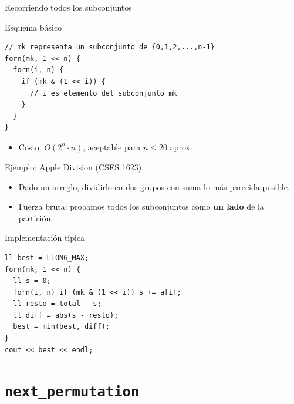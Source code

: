 \documentclass[aspectratio=169]{beamer}
\begin{document}
\begin{frame}[fragile]{Recorriendo todos los subconjuntos}
  \begin{block}{Esquema básico}
  \begin{lstlisting}[style=customc]
// mk representa un subconjunto de {0,1,2,...,n-1}
forn(mk, 1 << n) {
  forn(i, n) {
    if (mk & (1 << i)) {
      // i es elemento del subconjunto mk
    }
  }
}\end{lstlisting}
  \end{block}
  \begin{itemize}
    \item Costo: \(O(2^n \cdot n)\), aceptable para \(n \le 20\) aprox.
  \end{itemize}
\end{frame}

\begin{frame}[fragile]{Ejemplo: \href{https://cses.fi/problemset/task/1623}{Apple Division (CSES 1623)}}
  \begin{itemize}
    \item Dado un arreglo, dividirlo en dos grupos con suma lo más parecida posible.
    \item Fuerza bruta: probamos todos los subconjuntos como \textbf{un lado} de la partición.
  \end{itemize}
  \begin{block}{Implementación típica}
  \begin{lstlisting}[style=customc]
ll best = LLONG_MAX;
forn(mk, 1 << n) {
  ll s = 0;
  forn(i, n) if (mk & (1 << i)) s += a[i];
  ll resto = total - s;
  ll diff = abs(s - resto);
  best = min(best, diff);
}
cout << best << endl;\end{lstlisting}
  \end{block}
\end{frame}

\section{\texttt{next\_permutation}}
\end{document}
